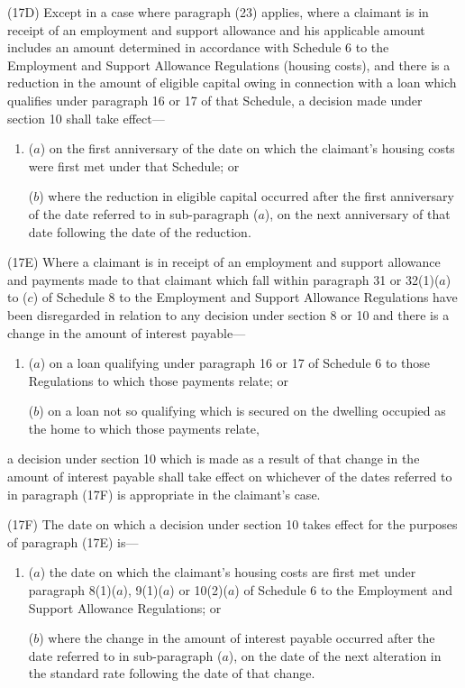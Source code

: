 \documentclass[12pt,a4paper]{article}
\begin{document}
(17D) Except in a case where paragraph (23) applies, where a claimant is in receipt of an employment and support allowance and his applicable amount includes an amount determined in accordance with Schedule 6 to the Employment and Support Allowance Regulations (housing costs), and there is a reduction in the amount of eligible capital owing in connection with a loan which qualifies under paragraph 16 or 17 of that Schedule, a decision made under section 10 shall take effect—
\begin{enumerate}\item[]
($a$) on the first anniversary of the date on which the claimant’s housing costs were first met under that Schedule; or

($b$) where the reduction in eligible capital occurred after the first anniversary of the date referred to in sub-paragraph ($a$), on the next anniversary of that date following the date of the reduction.
\end{enumerate}

(17E) Where a claimant is in receipt of an employment and support allowance and payments made to that claimant which fall within paragraph 31 or 32(1)($a$)  to ($c$)  of Schedule 8 to the Employment and Support Allowance Regulations have been disregarded in relation to any decision under section 8 or 10 and there is a change in the amount of interest payable—
\begin{enumerate}\item[]
($a$) on a loan qualifying under paragraph 16 or 17 of Schedule 6 to those Regulations to which those payments relate; or

($b$) on a loan not so qualifying which is secured on the dwelling occupied as the home to which those payments relate,
\end{enumerate}
a decision under section 10 which is made as a result of that change in the amount of interest payable shall take effect on whichever of the dates referred to in paragraph (17F) is appropriate in the claimant’s case.

(17F) The date on which a decision under section 10 takes effect for the purposes of paragraph (17E) is—
\begin{enumerate}\item[]
($a$) the date on which the claimant’s housing costs are first met under paragraph 8(1)($a$), 9(1)($a$)  or 10(2)($a$)  of Schedule 6 to the Employment and Support Allowance Regulations; or

($b$) where the change in the amount of interest payable occurred after the date referred to in sub-paragraph ($a$), on the date of the next alteration in the standard rate following the date of that change.
\end{enumerate}
\end{document}
